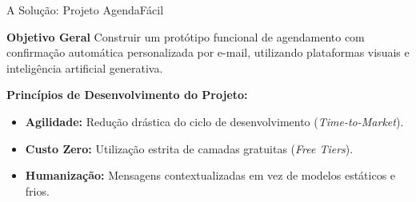 \documentclass[aspectratio=169, 10pt]{beamer}
\begin{document}
\begin{frame}{A Solução: Projeto AgendaFácil}
    \begin{block}{\textbf{Objetivo Geral}}
        Construir um protótipo funcional de agendamento com confirmação automática personalizada por e-mail, utilizando plataformas visuais e inteligência artificial generativa.
    \end{block}

    \vspace{0.3cm}
    \textbf{Princípios de Desenvolvimento do Projeto:}
    \begin{itemize}
        \item \textbf{Agilidade:} Redução drástica do ciclo de desenvolvimento (\textit{Time-to-Market}).
        \item \textbf{Custo Zero:} Utilização estrita de camadas gratuitas (\textit{Free Tiers}).
        \item \textbf{Humanização:} Mensagens contextualizadas em vez de modelos estáticos e frios.
    \end{itemize}
\end{frame}
\end{document}
